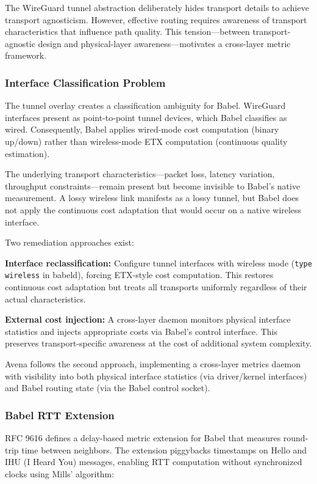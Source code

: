 The WireGuard tunnel abstraction deliberately hides transport details to achieve transport agnosticism. However, effective routing requires awareness of transport characteristics that influence path quality. This tension---between transport-agnostic design and physical-layer awareness---motivates a cross-layer metric framework.

\subsubsection{Interface Classification Problem}

The tunnel overlay creates a classification ambiguity for Babel. WireGuard interfaces present as point-to-point tunnel devices, which Babel classifies as wired. Consequently, Babel applies wired-mode cost computation (binary up/down) rather than wireless-mode ETX computation (continuous quality estimation).

The underlying transport characteristics---packet loss, latency variation, throughput constraints---remain present but become invisible to Babel's native measurement. A lossy wireless link manifests as a lossy tunnel, but Babel does not apply the continuous cost adaptation that would occur on a native wireless interface.

Two remediation approaches exist:

\textbf{Interface reclassification:} Configure tunnel interfaces with wireless mode (\texttt{type wireless} in babeld), forcing ETX-style cost computation. This restores continuous cost adaptation but treats all transports uniformly regardless of their actual characteristics.

\textbf{External cost injection:} A cross-layer daemon monitors physical interface statistics and injects appropriate costs via Babel's control interface. This preserves transport-specific awareness at the cost of additional system complexity.

Avena follows the second approach, implementing a cross-layer metrics daemon with visibility into both physical interface statistics (via driver/kernel interfaces) and Babel routing state (via the Babel control socket).

\subsubsection{Babel RTT Extension}

RFC 9616 defines a delay-based metric extension for Babel that measures round-trip time between neighbors. The extension piggybacks timestamps on Hello and IHU (I Heard You) messages, enabling RTT computation without synchronized clocks using Mills' algorithm:

